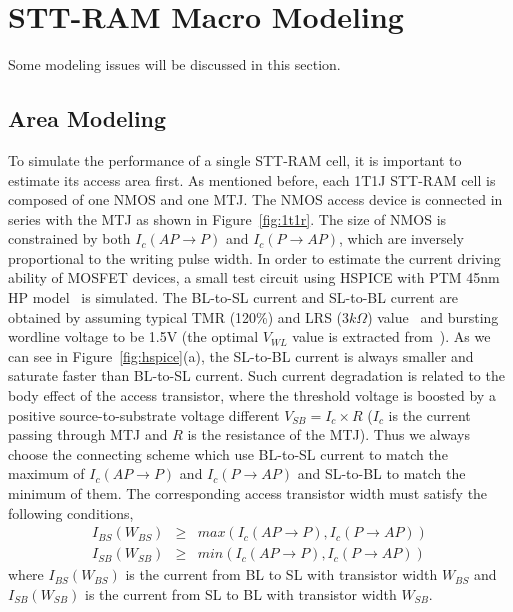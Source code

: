 \section{STT-RAM Macro Modeling} \label{sec:model}
Some modeling issues will be discussed in this section.

\subsection{Area Modeling}
To simulate the performance of a single STT-RAM cell, it is important to estimate its access area first. As mentioned before, each 1T1J STT-RAM cell is composed of one NMOS and one MTJ. The NMOS access device is connected in series with the MTJ as shown in Figure~\ref{fig:1t1r}. The size of NMOS is constrained by both $I_{c}(AP\rightarrow P)$ and $I_{c}(P\rightarrow AP)$, which are inversely proportional to the writing pulse width. In order to estimate the current driving ability of MOSFET devices, a small test circuit using HSPICE with PTM 45nm HP model~\cite{PTM} is simulated. The BL-to-SL current and SL-to-BL current are obtained by assuming typical TMR (120\%) and LRS ($3k\Omega$) value~\cite{STTRAM:Qualcomm09} and bursting wordline voltage to be 1.5V (the optimal $V_{WL}$ value is extracted from~\cite{STTRAM:Gatech10}). As we can see in Figure~\ref{fig:hspice}(a), the SL-to-BL current is always smaller and saturate faster than BL-to-SL current. Such current degradation is related to the body effect of the access transistor, where the threshold voltage is boosted by a positive source-to-substrate voltage different $V_{SB}=I_{c}\times R$ ($I_{c}$ is the current passing through MTJ and $R$ is the resistance of the MTJ). Thus we always choose the connecting scheme which use BL-to-SL current to match the maximum of $I_{c}(AP\rightarrow P)$ and $I_{c}(P\rightarrow AP)$ and SL-to-BL to match the minimum of them. The corresponding access transistor width must satisfy the following conditions,
\begin{eqnarray}
I_{BS}(W_{BS}) &\geq& max(I_{c}(AP\rightarrow P), I_{c}(P\rightarrow AP)) \\
I_{SB}(W_{SB}) &\geq& min(I_{c}(AP\rightarrow P), I_{c}(P\rightarrow AP))
\end{eqnarray}
where $I_{BS}(W_{BS})$ is the current from BL to SL with transistor width $W_{BS}$ and $I_{SB}(W_{SB})$ is the current from SL to BL with transistor width $W_{SB}$.


